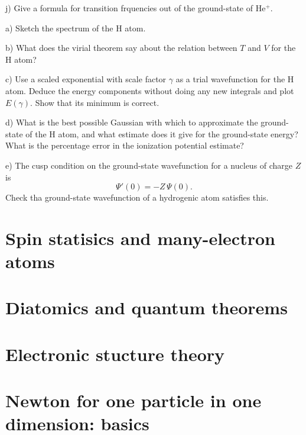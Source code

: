 j) Give a formula for transition frquencies out of the ground-state of He$^+$.

\newpage
{}

a) Sketch the spectrum of the H atom.

b) What does the virial theorem say about the relation between $T$ and $V$ for the 
H atom?

c) Use a scaled exponential with scale factor $\gamma$ as a trial wavefunction for
the H atom.  Deduce the energy components without doing any new integrals and plot
$E(\gamma)$.  Show that its minimum is correct.

d) What is the best possible Gaussian with which to approximate the ground-state
of the H atom, and what estimate does it give for the ground-state energy?  What 
is the percentage error in the ionization potential estimate?

e) The cusp condition on the ground-state wavefunction for a nucleus of charge $Z$ is 
$$\Psi'(0) = - Z\, \Psi(0).$$
Check tha ground-state wavefunction of a hydrogenic atom satisfies this.

\newpage
\part{Spin statisics and many-electron atoms}
\newpage
\part{Diatomics and quantum theorems}
\newpage
\part{Electronic stucture theory}
\label{page:end}


\part{Newton for one particle in one dimension: basics}
\newpage
{}

